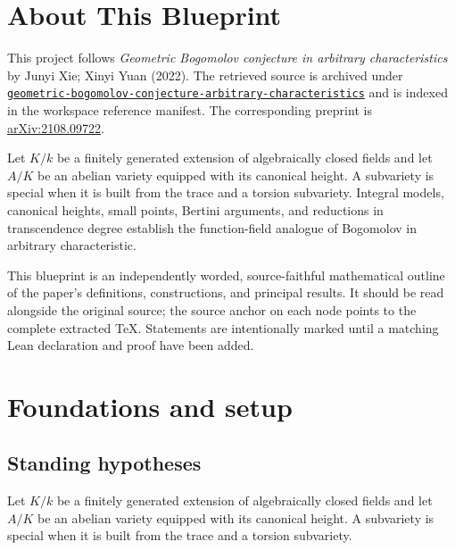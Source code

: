 

\chapter*{About This Blueprint}
\label{geometric-bogomolov-conjecture-arbitrary-characteristics-about}

This project follows \emph{Geometric Bogomolov conjecture in arbitrary characteristics} by Junyi Xie; Xinyi Yuan (2022). The
retrieved source is archived under
\href{../../../../../references/geometric-bogomolov-conjecture-arbitrary-characteristics/}{\texttt{geometric-bogomolov-conjecture-arbitrary-characteristics}} and is indexed in
the workspace reference manifest. The corresponding preprint is
\href{https://arxiv.org/abs/2108.09722}{arXiv:2108.09722}.

Let $K/k$ be a finitely generated extension of algebraically closed fields and let $A/K$ be an abelian variety equipped with its canonical height. A subvariety is special when it is built from the trace and a torsion subvariety. Integral models, canonical heights, small points, Bertini arguments, and reductions in transcendence degree establish the function-field analogue of Bogomolov in arbitrary characteristic.

This blueprint is an independently worded, source-faithful mathematical
outline of the paper's definitions, constructions, and principal results. It
should be read alongside the original source; the source anchor on each node
points to the complete extracted TeX. Statements are intentionally marked
\notready until a matching Lean declaration and proof have been added.

\chapter{Foundations and setup}
\label{chap:geometric-bogomolov-conjecture-arbitrary-characteristics-foundations}

\section{Standing hypotheses}
\label{sec:geometric-bogomolov-conjecture-arbitrary-characteristics-standing}

Let $K/k$ be a finitely generated extension of algebraically closed fields and let $A/K$ be an abelian variety equipped with its canonical height. A subvariety is special when it is built from the trace and a torsion subvariety.

